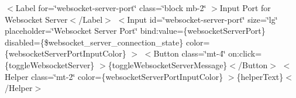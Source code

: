  $<$\+Label for=\char`\"{}websocket-\/server-\/port\char`\"{} class=\char`\"{}block mb-\/2\char`\"{}         $>$Input Port for Websocket Server$<$/\+Label$>$ $<$\+Input         id=\char`\"{}websocket-\/server-\/port\char`\"{}         size=\char`\"{}lg\char`\"{}         placeholder=\char`\"{}\+Websocket Server Port\char`\"{}         bind\+:value=\{websocket\+Server\+Port\}         disabled=\{\$websocket\+\_\+server\+\_\+connection\+\_\+state\}         color=\{websocket\+Server\+Port\+Input\+Color\}     $>$ $<$\+Button class=\char`\"{}mt-\/4\char`\"{} on\+:click=\{toggle\+Websocket\+Server\}         $>$\{toggle\+Websocket\+Server\+Message\}$<$/\+Button$>$ $<$\+Helper class=\char`\"{}mt-\/2\char`\"{} color=\{websocket\+Server\+Port\+Input\+Color\}         $>$\{helper\+Text\}$<$/\+Helper$>$  